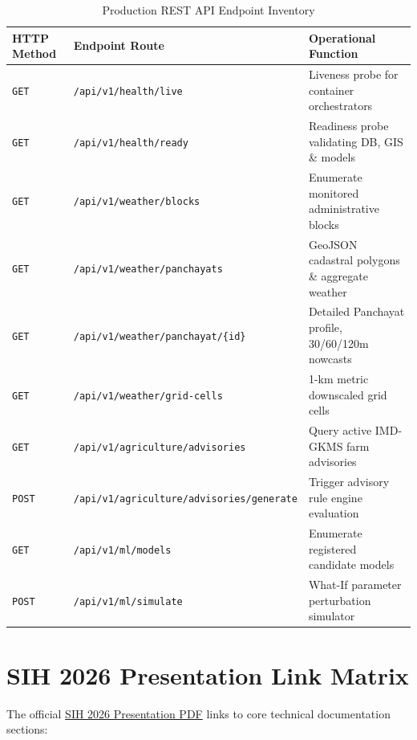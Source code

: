 \documentclass[11pt,a4paper,oneside]{report}
\begin{document}
\begin{table}[htbp]
\centering
\small
\caption{Production REST API Endpoint Inventory}
\label{tab:api_endpoints}
\begin{tabularx}{\textwidth}{l p{5.5cm} X}
\toprule
\textbf{HTTP Method} & \textbf{Endpoint Route} & \textbf{Operational Function} \\
\midrule
\texttt{GET} & \texttt{/api/v1/health/live} & Liveness probe for container orchestrators \\
\texttt{GET} & \texttt{/api/v1/health/ready} & Readiness probe validating DB, GIS \& models \\
\texttt{GET} & \texttt{/api/v1/weather/blocks} & Enumerate monitored administrative blocks \\
\texttt{GET} & \texttt{/api/v1/weather/panchayats} & GeoJSON cadastral polygons \& aggregate weather \\
\texttt{GET} & \texttt{\small /api/v1/weather/panchayat/\{id\}} & Detailed Panchayat profile, 30/60/120m nowcasts \\
\texttt{GET} & \texttt{/api/v1/weather/grid-cells} & 1-km metric downscaled grid cells \\
\texttt{GET} & \texttt{/api/v1/agriculture/advisories} & Query active IMD-GKMS farm advisories \\
\texttt{POST} & \texttt{\small /api/v1/agriculture/advisories/generate} & Trigger advisory rule engine evaluation \\
\texttt{GET} & \texttt{/api/v1/ml/models} & Enumerate registered candidate models \\
\texttt{POST} & \texttt{/api/v1/ml/simulate} & What-If parameter perturbation simulator \\
\bottomrule
\end{tabularx}
\end{table}

\chapter{SIH 2026 Presentation Link Matrix}

The official \href{https://github.com/AstroNewz/Downscaling-of-weather-forecast-from-Block-level-to-Panchayat-level/blob/main/SIH2026-IDEA-Presentation-Format.pptx_20260929_133126_0000.pdf}{SIH 2026 Presentation PDF} links to core technical documentation sections:
\end{document}
